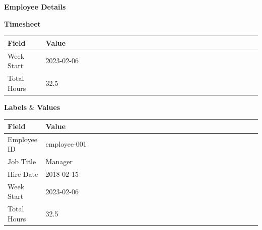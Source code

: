 \documentclass{article}
\begin{document}
\singlespacing

\begin{multicols}{2}
\textbf{Employee Details}\\

\begin{minipage}[t]{0.5\textwidth}
\vspace*{-1em}
\textbf{Timesheet}\\
\begin{longtable}{|C{0.15\linewidth}|L{0.85\linewidth}|}
  \hline
  \textbf{Field} & \textbf{Value} \\
  \hline
  Week Start & 2023-02-06 \\
  Total Hours & 32.5 \\
  \hline
  \end{longtable}
\vspace*{-1em}
\end{minipage}

\begin{minipage}[t]{0.45\textwidth}
\vspace*{-1em}
\textbf{Labels} & \textbf{Values}\\
\begin{tabularx}{\linewidth}{|C{0.15\linewidth}|L{0.85\linewidth}|}
  \hline
  \textbf{Field} & \textbf{Value} \\
  \hline
  Employee ID & employee-001 \\
  Job Title & Manager \\
  Hire Date & 2018-02-15 \\
  Week Start & 2023-02-06 \\
  Total Hours & 32.5 \\
  \hline
  \end{tabularx}
\vspace*{-1em}
\end{minipage}


\end{multicols}
\end{document}
